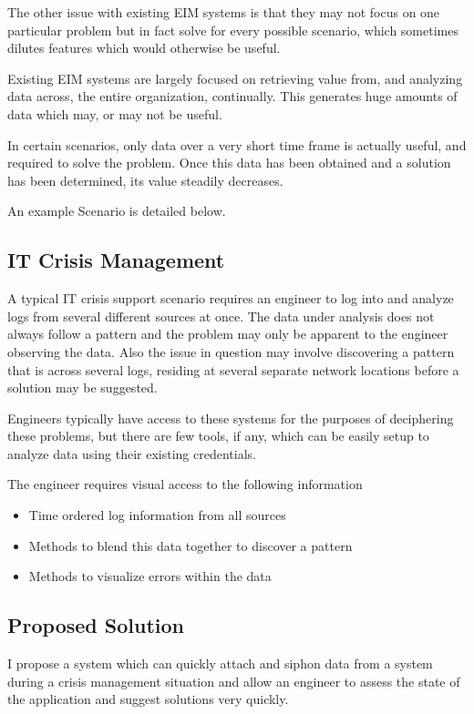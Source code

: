 \documentclass{llncs}
\begin{document}
The other issue with existing EIM systems is that they may not focus on one particular problem but in fact solve for every possible scenario, which sometimes dilutes features which would otherwise be useful.

Existing EIM systems are largely focused on retrieving value from, and analyzing data across, the entire organization, continually. This generates huge amounts of data which may, or may not be useful.

In certain scenarios, only data over a very short time frame is actually useful, and required to solve the problem. Once this data has been obtained and a solution has been determined, its value steadily decreases.

An example Scenario is detailed below.

\subsection{IT Crisis Management}

A typical IT crisis support scenario requires an engineer to log into and analyze logs from several different sources at once. The data under analysis does not always follow a pattern and the problem may only be apparent to the engineer observing the data. Also the issue in question may involve discovering a pattern that is across several logs, residing at several separate network locations before a solution may be suggested.

Engineers typically have access to these systems for the purposes of deciphering these problems, but there are few tools, if any, which can be easily setup to analyze data using their existing credentials.

The engineer requires visual access to the following information

\begin{itemize}
\item Time ordered log information from all sources
\item Methods to blend this data together to discover a pattern
\item Methods to visualize errors within the data
\end{itemize}

\subsection{Proposed Solution}

I propose a system which can quickly attach and siphon data from a system during a crisis management situation and allow an engineer to assess the state of the application and suggest solutions very quickly.
\end{document}
